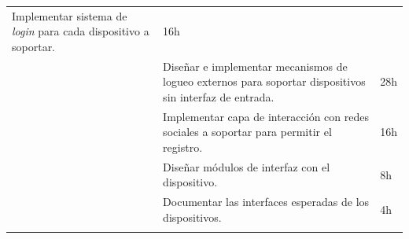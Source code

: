 \begin{longtable}[c]{@{}lll@{}}
\begin{minipage}[t]{0.62\columnwidth}
Implementar sistema de \emph{login} para cada dispositivo a soportar.
\end{minipage} & \begin{minipage}[t]{0.10\columnwidth}\raggedright
16h
\end{minipage}
\\\noalign{\medskip}
\begin{minipage}[t]{0.28\columnwidth}\raggedright
\end{minipage} & \begin{minipage}[t]{0.62\columnwidth}\raggedright
Diseñar e implementar mecanismos de logueo externos para soportar
dispositivos sin interfaz de entrada.
\end{minipage} & \begin{minipage}[t]{0.10\columnwidth}\raggedright
28h
\end{minipage}
\\\noalign{\medskip}
\begin{minipage}[t]{0.28\columnwidth}\raggedright
\end{minipage} & \begin{minipage}[t]{0.62\columnwidth}\raggedright
Implementar capa de interacción con redes sociales a soportar para
permitir el registro.
\end{minipage} & \begin{minipage}[t]{0.10\columnwidth}\raggedright
16h
\end{minipage}
\\\noalign{\medskip}
\begin{minipage}[t]{0.28\columnwidth}\raggedright
\end{minipage} & \begin{minipage}[t]{0.62\columnwidth}\raggedright
Diseñar módulos de interfaz con el dispositivo.
\end{minipage} & \begin{minipage}[t]{0.10\columnwidth}\raggedright
8h
\end{minipage}
\\\noalign{\medskip}
\begin{minipage}[t]{0.28\columnwidth}\raggedright
\end{minipage} & \begin{minipage}[t]{0.62\columnwidth}\raggedright
Documentar las interfaces esperadas de los dispositivos.
\end{minipage} & \begin{minipage}[t]{0.10\columnwidth}\raggedright
4h
\end{minipage}
\\\noalign{\medskip}

\end{longtable}
